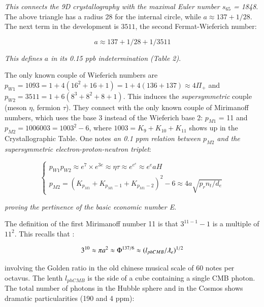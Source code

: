\documentclass[a4paper,9pt]{article}
\begin{document}
\textit{This connects the 9D crystallography with the maximal Euler number $s_{65}$ = 1848}. The above triangle has a radius 28 for the internal circle, while $a \approx 137 + 1/28$. The next term in the development is $3511 $, the second Fermat-Wieferich number: \cite{Ribenboim}

\begin{equation}
a \approx 137 + 1/28 + 1/3511
\end{equation}

\textit {This defines $a$ in its 0.15 ppb indetermination (Table 2)}. 

The only known couple of Wieferich numbers are $p_{W1} = 1093 = 1+ 4(16^2 + 16 + 1) = 1 + 4(136+137) \approx 4 \Pi_+ $ and $p_{W2} = 3511 = 1+ 6(8^3 + 8^2 + 8 +1)$. This induces the \textit {supersymmetric} couple (meson $\eta$, fermion $\tau$). They connect with the only known couple of Mirimanoff numbers, which uses the base 3 instead of the Wieferich base 2: $p_{M1}$ = 11 and $p_{M2} = 1006003 = 1003^2 - 6$, where $1003 = K_9 + K_{10} + K_{11}$ shows up in the Crystallographic Table. One notes  \textit {an 0.1 ppm relation between $p_{M2}$ and the supersymmetric electron-proton-neutron triplet}:


\begin{equation}
 \left\{
    \begin{array}{ll}
    p_{W1} p_{W2} \approx e^7 \times e^{3e} \approx \eta \tau \approx  e^{e^e} \approx  e^e aH\\
    
         p_{M2} = (K_{p_{M1}} + K_{p_{M1}-1} + K_{p_{M1}-2})^2 - 6 \approx 4a \sqrt {p_rn_t/d_e}      

    \end{array}
\right.
\end{equation}

\textit{proving the pertinence of the basic economic number E}.

The definition of the first Mirimanoff number 11 is that $3^{11-1}-1$ is a multiple of $11^2$. This recalls that \cite{Sanchez1}:

\begin{equation}
3^{10} \approx \pi a^2 \approx \Phi^{137/6} \approx (l_{phCMB}/\lambdabar_e)^{1/2}
\end{equation}

involving the Golden ratio in the old chinese musical scale of 60 notes per octavus. The lenth $l_{phCMB}$
is the side of a cube containing a single CMB photon. The total number of photons in the Hubble sphere and in the Cosmos shows dramatic particularities (190 and 4 ppm):
\end{document}
